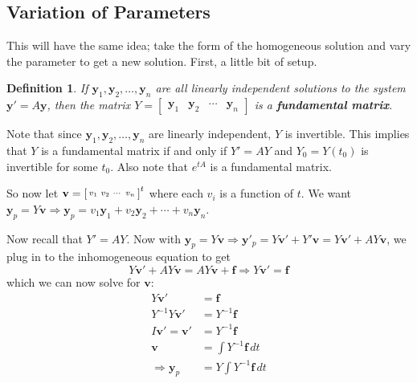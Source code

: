 \documentclass[letterpaper, 11pt, openany]{book}
\theoremstyle{mytheoremstyle}
\newtheorem{definition}{Definition}[section]
\theoremstyle{myexamplestyle}
\begin{document}
\subsection{Variation of Parameters}
This will have the same idea; take the form of the homogeneous solution and vary the parameter to get a new solution. First, a little bit of setup.

\begin{definition}\label{d:fundamental-matrix}
    If \(\mathbf{y}_{1}, \mathbf{y}_{2}, \dots , \mathbf{y}_{n}\) are all linearly independent solutions to the system \(\mathbf{y}' = A \mathbf{y}\), then the matrix \(Y = \begin{bmatrix}\mathbf{y}_{1} & \mathbf{y}_{2} & \cdots & \mathbf{y}_{n} \end{bmatrix}\) is a \textbf{fundamental matrix}.
\end{definition}
Note that since \(\mathbf{y}_{1}, \mathbf{y}_{2}, \dots , \mathbf{y}_{n}\) are linearly independent, \(Y\) is invertible. This implies that \(Y\) is a fundamental matrix if and only if \(Y' = AY\) and \(Y_{0} = Y(t_{0})\) is invertible for some \(t_{0}\). Also note that \(e^{tA}\) is a fundamental matrix.

So now let \(\mathbf{v} = \begin{bsmallmatrix}
    v_{1} & v_{2} & \cdots & v_{n}
\end{bsmallmatrix}^{t}\) where each \(v_{i}\) is a function of \(t\). We want \(\mathbf{y}_{p} = Y \mathbf{v} \Rightarrow \mathbf{y}_{p} = v_{1}\mathbf{y}_{1} + v_{2}\mathbf{y}_{2} + \cdots + v_{n}\mathbf{y}_{n}\).

Now recall that \(Y' = AY\). Now with \(\mathbf{y}_{p} = Y \mathbf{v} \Rightarrow \mathbf{y}'_{p} = Y \mathbf{v}' + Y' \mathbf{v} = Y \mathbf{v}' + AY \mathbf{v}\), we plug in to the inhomogeneous equation to get
\[Y \mathbf{v}' + AY \mathbf{v} = AY \mathbf{v} + \mathbf{f} \Rightarrow Y \mathbf{v}' = \mathbf{f}\]
which we can now solve for \(\mathbf{v}\):
\begin{align*}
    Y \mathbf{v}' &= \mathbf{f}\\
    Y^{-1} Y \mathbf{v}' &= Y^{-1} \mathbf{f}\\
    I \mathbf{v}' = \mathbf{v}' &= Y^{-1} \mathbf{f}\\
    \mathbf{v} &= \int Y^{-1} \mathbf{f} \, dt\\
    \Rightarrow \mathbf{y}_{p} &= Y \int Y^{-1} \mathbf{f} \, dt
\end{align*}
\end{document}
